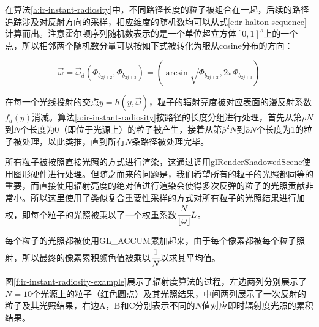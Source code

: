 在算法\ref{a:ir-instant-radiosity}中，不同路径长度的粒子被组合在一起，后续的路径追踪涉及对反射方向的采样，相应维度的随机数均可以从式\ref{e:ir-halton-sequence}计算而出。注意霍尔顿序列随机数表示的是一个单位超立方体$[0,1]^{s}$上的一个点，所以相邻两个随机数分量可以按如下式被转化为服从cosine分布的方向：

\begin{equation}
	\vec{\omega}=\vec{\omega}_d(\Phi_{b_{2j+2}},\Phi_{b_{2j+3}})=(\arcsin\sqrt{\Phi_{b_{2j+2}}},2\pi \Phi_{b_{2j+3}})
\end{equation}

\noindent 在每一个光线投射的交点$y=h(y,\vec{\omega})$，粒子的辐射亮度被对应表面的漫反射系数$f_d(y)$消减。算法\ref{a:ir-instant-radiosity}按路径的长度分组进行处理，首先从第$\overline{\rho}N$到$N$个长度为0（即位于光源上）的粒子被产生，接着从第$\overline{\rho}^{2}N$到$\overline{\rho}N$个长度为1的粒子被处理，以此类推，直到所有$N$条路径被处理完毕。

所有粒子被按照直接光照的方式进行渲染，这通过调用glRenderShadowedScene使用图形硬件进行处理。但随之而来的问题是，我们希望所有的粒子的光照都同等的重要，而直接使用辐射亮度的绝对值进行渲染会使得多次反弹的粒子的光照贡献非常小。所以这里使用了类似复合重要性采样的方式对所有粒子的光照结果进行加权，即每个粒子的光照被乘以了一个权重系数$ \cfrac{N}{\lfloor\omega\rfloor}L$。

每个粒子的光照都被使用GL\_ACCUM累加起来，由于每个像素都被每个粒子照射，所以最终的像素累积颜色值被乘以$ \cfrac{1}{N}$以求其平均值。

图\ref{f:ir-instant-radiosity-example}展示了辐射度算法的过程，左边两列分别展示了$N=10$个光源上的粒子（红色圆点）及其光照结果，中间两列展示了一次反射的粒子及其光照结果，右边A，B和C分别表示不同的$N$值对应即时辐射度光照的累积结果。

